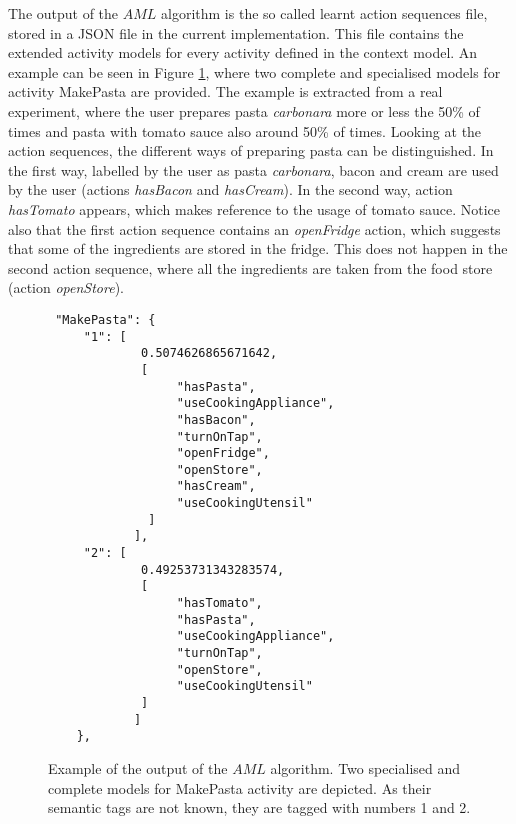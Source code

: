 The output of the $AML$ algorithm is the so called learnt action sequences file, stored in a JSON file in the current implementation. This file contains the extended activity models for every activity defined in the context model. An example can be seen in Figure \ref{fig-aml-output}, where two complete and specialised models for activity MakePasta are provided. The example is extracted from a real experiment, where the user prepares pasta \textit{carbonara} more or less the 50\% of times and pasta with tomato sauce also around 50\% of times. Looking at the action sequences, the different ways of preparing pasta can be distinguished. In the first way, labelled by the user as pasta \textit{carbonara}, bacon and cream are used by the user (actions \textit{hasBacon} and \textit{hasCream}). In the second way, action \textit{hasTomato} appears, which makes reference to the usage of tomato sauce. Notice also that the first action sequence contains an \textit{openFridge} action, which suggests that some of the ingredients are stored in the fridge. This does not happen in the second action sequence, where all the ingredients are taken from the food store (action \textit{openStore}).

\begin{figure}[htbp]
\begin{small}
\begin{lstlisting}
 "MakePasta": {
     "1": [          
             0.5074626865671642, 
             [
                  "hasPasta", 
                  "useCookingAppliance", 
                  "hasBacon", 
                  "turnOnTap", 
                  "openFridge", 
                  "openStore", 
                  "hasCream", 
                  "useCookingUtensil"
              ]
            ],
     "2": [
             0.49253731343283574, 
             [
                  "hasTomato", 
                  "hasPasta", 
                  "useCookingAppliance", 
                  "turnOnTap", 
                  "openStore", 
                  "useCookingUtensil"
             ]
            ]        
    }, 

\end{lstlisting}
\end{small}
\caption{Example of the output of the $AML$ algorithm. Two specialised and complete models for MakePasta activity are depicted. As their semantic tags are not known, they are tagged with numbers 1 and 2.}
\label{fig-aml-output}
\end{figure}


